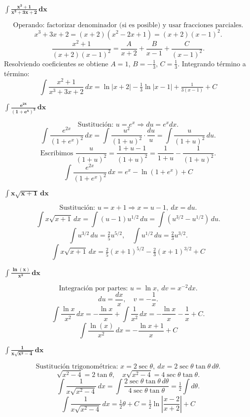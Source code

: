 $\displaystyle \mathbf{\int \frac{x^{2}+1}{x^{3}+3x+2}\,dx}$

\nopagebreak
\[
\text{Operando: factorizar denominador (si es posible) y usar fracciones parciales.}
\]
\[
x^{3}+3x+2=(x+2)(x^{2}-2x+1)=(x+2)(x-1)^{2}.
\]
\[
\frac{x^{2}+1}{(x+2)(x-1)^{2}} = \frac{A}{x+2} + \frac{B}{x-1} + \frac{C}{(x-1)^{2}}.
\]
Resolviendo coeficientes se obtiene $A=1$, $B=-\tfrac{1}{3}$, $C=\tfrac{1}{3}$. Integrando término a término:
\[
\boxed{\displaystyle
\int \frac{x^{2}+1}{x^{3}+3x+2}\,dx
= \ln|x+2| - \tfrac{1}{3}\ln|x-1| + \tfrac{1}{3(x-1)} + C
}
\]

$\displaystyle \mathbf{\int \frac{e^{2x}}{(1+e^{x})^{2}}\,dx}$

\nopagebreak
\[
\text{Sustitución: } u = e^{x} \Rightarrow du = e^{x}dx.
\]
\[
\int \frac{e^{2x}}{(1+e^{x})^{2}}\,dx
= \int \frac{u^{2}}{(1+u)^{2}}\cdot\frac{du}{u}
= \int \frac{u}{(1+u)^{2}}\,du.
\]
\[
\text{Escribimos } \frac{u}{(1+u)^{2}} = \frac{1+u-1}{(1+u)^{2}} = \frac{1}{1+u} - \frac{1}{(1+u)^{2}}.
\]
\[
\boxed{\displaystyle
\int \frac{e^{2x}}{(1+e^{x})^{2}}\,dx
= e^{x} - \ln(1+e^{x}) + C
}
\]

$\displaystyle \mathbf{\int x\sqrt{x+1}\,dx}$

\nopagebreak
\[
\text{Sustitución: } u = x+1 \Rightarrow x = u-1, \ dx=du.
\]
\[
\int x\sqrt{x+1}\,dx = \int (u-1)u^{1/2}\,du
= \int (u^{3/2} - u^{1/2})\,du.
\]
\[
\int u^{3/2}\,du = \tfrac{2}{5}u^{5/2},\quad \int u^{1/2}\,du = \tfrac{2}{3}u^{3/2}.
\]
\[
\boxed{\displaystyle
\int x\sqrt{x+1}\,dx
= \tfrac{2}{5}(x+1)^{5/2} - \tfrac{2}{3}(x+1)^{3/2} + C
}
\]

$\displaystyle \mathbf{\int \frac{\ln(x)}{x^{2}}\,dx}$

\nopagebreak
\[
\text{Integración por partes: } u=\ln x,\ dv = x^{-2}dx.
\]
\[
du = \frac{dx}{x},\quad v = -\frac{1}{x}.
\]
\[
\int \frac{\ln x}{x^{2}}\,dx = -\frac{\ln x}{x} + \int \frac{1}{x^{2}}\,dx
= -\frac{\ln x}{x} - \frac{1}{x} + C.
\]
\[
\boxed{\displaystyle
\int \frac{\ln(x)}{x^{2}}\,dx
= -\frac{\ln x + 1}{x} + C
}
\]

$\displaystyle \mathbf{\int \frac{1}{x\sqrt{x^{2}-4}}\,dx}$

\nopagebreak
\[
\text{Sustitución trigonométrica: } x = 2\sec\theta,\ dx = 2\sec\theta\tan\theta\,d\theta.
\]
\[
\sqrt{x^{2}-4} = 2\tan\theta,\quad x\sqrt{x^{2}-4}=4\sec\theta\tan\theta.
\]
\[
\int \frac{1}{x\sqrt{x^{2}-4}}\,dx
= \int \frac{2\sec\theta\tan\theta\,d\theta}{4\sec\theta\tan\theta} = \tfrac{1}{2}\int d\theta.
\]
\[
\boxed{\displaystyle
\int \frac{1}{x\sqrt{x^{2}-4}}\,dx
= \tfrac{1}{2}\theta + C
= \tfrac{1}{2}\ln\!\left|\frac{x-2}{x+2}\right| + C
}
\]

